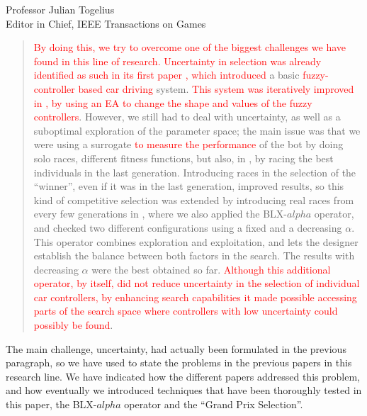 \documentclass[10pt]{letter} %
\begin{document}
\begin{letter}{Professor Julian Togelius \\ Editor in Chief, IEEE Transactions on Games}
\begin{enumerate}
\begin{itemize}
                  \begin{quote}
                    \textcolor{red}{By doing this, we try to overcome one of the biggest
challenges we have found in this line of research. Uncertainty in
selection was already identified as such in its first paper
\cite{salem_evo17}, which introduced} a basic
\textcolor{red}{fuzzy-controller based car driving}
system. \textcolor{red}{This system was iteratively improved in
\cite{salem_evo18,salem_ipmu18}, by using an EA to change the shape
and values of the fuzzy controllers}. However, we still had to deal
with uncertainty, as well as a suboptimal exploration of the parameter
space; the main issue was that we were using a surrogate
\textcolor{red}{to measure the performance} of the bot by doing solo
races, \textcolor{and we tried to make that surrogate as accurate as
  possible by testing} different
fitness functions, but also, in \cite{salem_cig2018}, by racing the best individuals in the last
generation. Introducing
races in the selection of the ``winner'', even if it was in the last
generation, improved results, so this kind of competitive selection
was extended by introducing real races from every few generations in
\cite{DBLP:conf/cig/SalemMG19}, where we also applied the BLX-$alpha$
operator, and checked two different configurations using a fixed and a
decreasing $\alpha$. This operator combines exploration and
exploitation, and lets the designer establish the balance between both factors in the search. The
results with decreasing $\alpha$ were the best obtained so
far. \textcolor{red}{Although this additional operator, by itself, did
  not reduce uncertainty in the selection of individual car
  controllers, by enhancing search capabilities it made possible
  accessing parts of the search space where controllers with low
  uncertainty could possibly be found}.
\end{quote}

The main challenge, uncertainty, had actually been formulated in the
previous paragraph, so we have used to state the problems in the
previous papers in this research line. We have indicated how the
different papers addressed this problem, and how eventually we
introduced techniques that have been thoroughly tested in this paper,
the BLX-$alpha$ operator and the ``Grand Prix Selection''.


\end{itemize}
\end{enumerate}
\end{letter}
\end{document}
